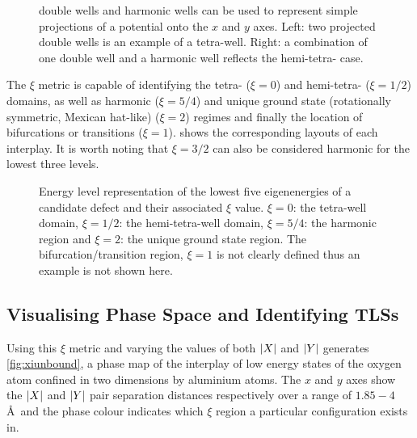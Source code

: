 \begin{figure}[htp]
\resizebox{0.8\textwidth}{!}{}
\caption[Potential Projections]{\label{fig:mexhatproj} double wells  and harmonic wells  can be used to represent simple projections of a  potential onto the $x$ and $y$ axes. Left: two projected double wells is an example of a tetra-well. Right: a combination of one double well and a harmonic well reflects the hemi-tetra- case.}
\end{figure}

The $\xi$ metric is capable of identifying the tetra- ($\xi=0$) and hemi-tetra- ($\xi=1/2$) domains, as well as harmonic ($\xi=5/4$) and unique ground state (rotationally symmetric, Mexican hat-like) ($\xi=2$) regimes and finally the location of bifurcations or transitions ($\xi=1$).
 shows the corresponding layouts of each interplay.
It is worth noting that $\xi=3/2$ can also be considered harmonic for the lowest three levels.

\begin{figure}[htp]
  \resizebox{\textwidth}{!}{}
  \caption[$\xi$ Metric]{\label{fig:ximetric}Energy level representation of the lowest five eigenenergies of a candidate defect and their associated $\xi$ value. $\xi=0$: the tetra-well domain, $\xi=1/2$: the hemi-tetra-well domain, $\xi=5/4$: the harmonic region and $\xi=2$: the unique ground state region. The bifurcation/transition region, $\xi=1$ is not clearly defined thus an example is not shown here.}
\end{figure}

\subsection{Visualising Phase Space and Identifying TLSs}\label{sec:phasespace}

Using this $\xi$ metric and varying the values of both $\lvert X\rvert$ and $\lvert Y\rvert$ generates \cref{fig:xiunbound}, a phase map of the interplay of low energy states of the oxygen atom confined in two dimensions by aluminium atoms.
The $x$ and $y$ axes show the $\lvert X\rvert$ and $\lvert Y\rvert$ pair separation distances respectively over a range of $1.85\!-\!4$ \AA\ and the phase colour indicates which $\xi$ region a particular configuration exists in.

